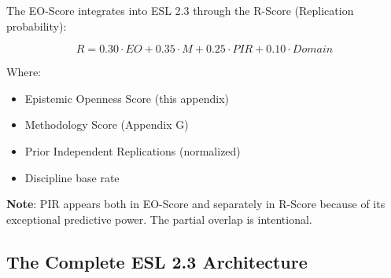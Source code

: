 \documentclass[11pt,a4paper]{article}
\begin{document}
The EO-Score integrates into ESL 2.3 through the R-Score (Replication probability):

\begin{formulabox}[title={R-Score (ESL 2.3 Final)}]
\begin{equation}
\boxed{R = 0.30 \cdot EO + 0.35 \cdot M + 0.25 \cdot PIR + 0.10 \cdot Domain}
\label{eq:rscore}
\end{equation}

Where:
\begin{itemize}[leftmargin=2cm]
    \item[\textbf{EO}] Epistemic Openness Score (this appendix)
    \item[\textbf{M}] Methodology Score (Appendix G)
    \item[\textbf{PIR}] Prior Independent Replications (normalized)
    \item[\textbf{Domain}] Discipline base rate
\end{itemize}

\textbf{Note}: PIR appears both in EO-Score and separately in R-Score because of its exceptional predictive power. The partial overlap is intentional.
\end{formulabox}

\subsection{The Complete ESL 2.3 Architecture}
\end{document}
